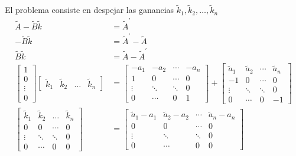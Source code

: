 El problema consiste en despejar las ganancias \( \tilde{k}_{1}, \tilde{k}_{2}, \ldots, \tilde{k}_{n} \)
\[
    \begin{split}
        \tilde{A} - \tilde{B} \tilde{k} & = \tilde{A}^{'} \\ 
        -\tilde{B} \tilde{k} & = \tilde{A}^{'} - \tilde{A} \\
        \tilde{B} \tilde{k} & = \tilde{A} - \tilde{A}^{'} \\
    \begin{bmatrix}
        1 \\ 0 \\ \vdots \\ 0
    \end{bmatrix}
    \begin{bmatrix}
        \tilde{k}_{1} & \tilde{k}_{2} & \ldots & \tilde{k}_{n}
    \end{bmatrix} & =
    \begin{bmatrix}
        -a_{1} & -a_{2} & \cdots & -a_{n} \\
        1 & 0 & \cdots & 0 \\
        \vdots & \ddots & \ddots & 0 \\
        0 & \cdots & 0 & 1
    \end{bmatrix}
    +
    \begin{bmatrix}
        \tilde{a}_{1} & \tilde{a}_{2} & \cdots & \tilde{a}_{n} \\
        -1 & 0 & \cdots & 0 \\
        \vdots & \ddots & \ddots & 0 \\
        0 & \cdots & 0 & -1
    \end{bmatrix} \\
    \begin{bmatrix}
        \tilde{k}_{1} & \tilde{k}_{2} & \ldots & \tilde{k}_{n} \\
        0 & 0 & \cdots & 0 \\
        \vdots & \ddots & \ddots & 0 \\
        0 & \cdots & 0 & 0
    \end{bmatrix} 
    & =
    \begin{bmatrix}
        \tilde{a}_{1} - a_{1} & \tilde{a}_{2} - a_{2} & \cdots & \tilde{a}_{n} - a_{n} \\
        0 & 0 & \cdots & 0 \\
        \vdots & \ddots & \ddots & 0 \\
        0 & \cdots & 0 & 0
    \end{bmatrix} \\
    \end{split}
\]

